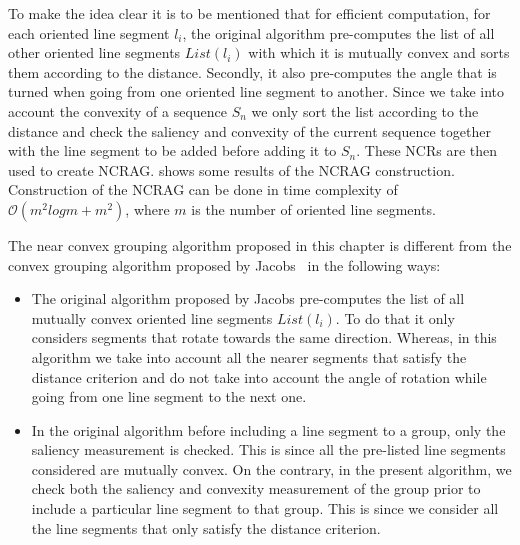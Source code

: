 To make the idea clear it is to be mentioned that for efficient computation, for each oriented line segment $l_i$, the original algorithm pre-computes the list of all other oriented line segments $List(l_i)$ with which it is mutually convex and sorts them according to the distance. Secondly, it also pre-computes the angle that is turned when going from one oriented line segment to another. Since we take into account the convexity of a sequence $S_n$ we only sort the list according to the distance and check the saliency and convexity of the current sequence together with the line segment to be added before adding it to $S_n$. These NCRs are then used to create NCRAG.  shows some results of the NCRAG construction. Construction of the NCRAG can be done in time complexity of $\mathcal{O}(m^2logm+m^2)$, where $m$ is the number of oriented line segments.

The near convex grouping algorithm proposed in this chapter is different from the convex grouping algorithm proposed by Jacobs~\cite{Jacobs1989} in the following ways:
\begin{itemize}
\item The original algorithm proposed by Jacobs pre-computes the list of all mutually convex oriented line segments $List(l_i)$. To do that it only considers segments that rotate towards the same direction. Whereas, in this algorithm we take into account all the nearer segments that satisfy the distance criterion and do not take into account the angle of rotation while going from one line segment to the next one.
\item In the original algorithm before including a line segment to a group, only the saliency measurement is checked. This is since all the pre-listed line segments considered are mutually convex. On the contrary, in the present algorithm, we check both the saliency and convexity measurement of the group prior to include a particular line segment to that group. This is since we consider all the line segments that only satisfy the distance criterion.
\end{itemize}

